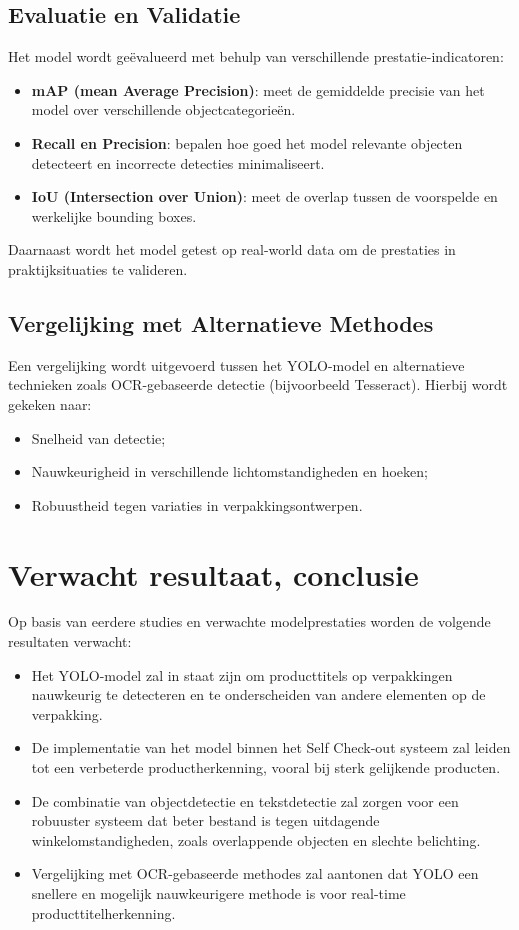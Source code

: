 \subsection{Evaluatie en Validatie}
Het model wordt geëvalueerd met behulp van verschillende prestatie-indicatoren:
\begin{itemize}
    \item \textbf{mAP (mean Average Precision)}: meet de gemiddelde precisie van het model over verschillende objectcategorieën.
    \item \textbf{Recall en Precision}: bepalen hoe goed het model relevante objecten detecteert en incorrecte detecties minimaliseert.
    \item \textbf{IoU (Intersection over Union)}: meet de overlap tussen de voorspelde en werkelijke bounding boxes.
\end{itemize}
Daarnaast wordt het model getest op real-world data om de prestaties in praktijksituaties te valideren.

\subsection{Vergelijking met Alternatieve Methodes}
Een vergelijking wordt uitgevoerd tussen het YOLO-model en alternatieve technieken zoals OCR-gebaseerde detectie (bijvoorbeeld Tesseract). Hierbij wordt gekeken naar:
\begin{itemize}
    \item Snelheid van detectie;
    \item Nauwkeurigheid in verschillende lichtomstandigheden en hoeken;
    \item Robuustheid tegen variaties in verpakkingsontwerpen.
\end{itemize}
\section{Verwacht resultaat, conclusie}%
\label{sec:verwachte_resultaten}

Op basis van eerdere studies en verwachte modelprestaties worden de volgende resultaten verwacht:
\begin{itemize}
    \item Het YOLO-model zal in staat zijn om producttitels op verpakkingen nauwkeurig te detecteren en te onderscheiden van andere elementen op de verpakking.
    \item De implementatie van het model binnen het Self Check-out systeem zal leiden tot een verbeterde productherkenning, vooral bij sterk gelijkende producten.
    \item De combinatie van objectdetectie en tekstdetectie zal zorgen voor een robuuster systeem dat beter bestand is tegen uitdagende winkelomstandigheden, zoals overlappende objecten en slechte belichting.
    \item Vergelijking met OCR-gebaseerde methodes zal aantonen dat YOLO een snellere en mogelijk nauwkeurigere methode is voor real-time producttitelherkenning.
\end{itemize}

